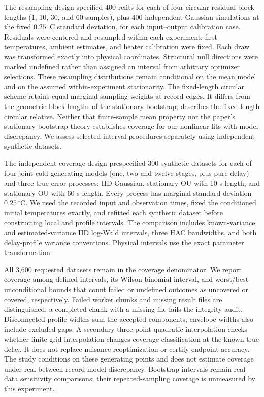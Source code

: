 \documentclass[11pt]{article}
\begin{document}
The resampling design specified 400 refits for each of four circular residual
block lengths (1, 10, 30, and 60 samples), plus 400 independent Gaussian
simulations at the fixed $0.25\,{}^\circ\mathrm C$ standard deviation, for each
input--output calibration case. Residuals were centered and resampled within
each experiment; first temperatures, ambient estimates, and heater calibration
were fixed. Each draw was transformed exactly into physical coordinates.
Structural null directions were marked undefined rather than assigned an interval
from arbitrary optimizer selections. These resampling distributions remain
conditional on the mean model and on the assumed within-experiment stationarity.
The fixed-length circular scheme retains equal marginal sampling weights at
record edges. It differs from the geometric block lengths of the stationary
bootstrap; \citet[physical PDF p.~3, Remark 2]{politis-1994-stationary} describes
the fixed-length circular relative. Neither that finite-sample mean property nor
the paper's stationary-bootstrap theory establishes coverage for our nonlinear
fits with model discrepancy. We assess selected interval procedures separately
using independent synthetic datasets.

The independent coverage design prespecified 300 synthetic datasets for each
of four joint cold generating models (one, two and twelve stages, plus pure
delay) and three true error processes: IID Gaussian, stationary OU with 10 s
length, and stationary OU with 60 s length. Every process has marginal standard
deviation $0.25\,{}^\circ\mathrm C$. We used the recorded input and observation
times, fixed the conditioned initial temperatures exactly, and refitted each
synthetic dataset before constructing local and profile intervals. The
comparison includes known-variance and estimated-variance IID log-Wald
intervals, three HAC bandwidths, and both delay-profile variance conventions.
Physical intervals use the exact parameter transformation.

All 3,600 requested datasets remain in the coverage denominator. We report
coverage among defined intervals, its Wilson binomial interval, and worst/best
unconditional bounds that count failed or undefined outcomes as uncovered or
covered, respectively. Failed worker chunks and missing result files are
distinguished: a completed chunk with a missing file fails the integrity audit.
Disconnected profile widths sum the accepted components; envelope widths also
include excluded gaps. A secondary three-point quadratic interpolation checks
whether finite-grid interpolation changes coverage classification at the known
true delay. It does not replace nuisance reoptimization or certify endpoint
accuracy. The study conditions on these generating points and does not estimate
coverage under real between-record model discrepancy.
Bootstrap intervals remain real-data sensitivity comparisons; their
repeated-sampling coverage is unmeasured by this experiment.
\end{document}
